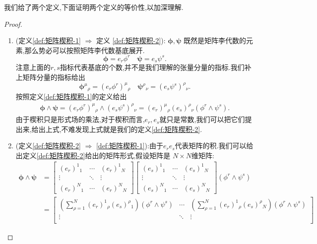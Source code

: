 \documentclass[../main.tex]{subfiles}
\begin{document}
我们给了两个定义,下面证明两个定义的等价性,以加深理解.
\begin{proof}
\begin{enumerate}
  \item (定义\ref{def:矩阵楔积-1} $\Rightarrow$ 定义 \ref{def:矩阵楔积-2}): $\bm{\phi} ,\bm{\psi}  $ 既然是矩阵李代数的元素,那么势必可以按照矩阵李代数基底展开.\[
  \bm{\phi} =  e_r \phi^r \quad  \bm{\psi} = e_s \psi^s 
  .\] 
  注意上面的$r,s$指标代表基底的个数,并不是我们理解的张量分量的指标.我们补上矩阵分量的指标给出\[
    \bm{\phi}^{\mu}{}_{\rho} = (e_r \phi^r)^{\mu}{}_{\rho} \quad \bm{\psi}^{\rho}{}_\nu = (e_s \psi^s)^{\rho}{}_{\nu}
  .\] 
  按照定义\ref{def:矩阵楔积-1}的定义给出
   \begin{align*}
    \bm{\phi} \wedge \bm{\psi} = (e_r \phi^r)^{\mu}{}_{\rho} \wedge (e_s \psi^s) ^{\rho}{}_{\nu} = (e_r)^{\mu}{}_{\rho}(e_s)^{\rho}{}_{\nu}(\phi^r \wedge \psi^s)   
  .\end{align*}
  由于楔积只是形式场的乘法,对于楔积而言,$e_r,e_s$就只是常数,我们可以把它们提出来,给出上式,不难发现上式就是我们的定义\ref{def:矩阵楔积-2}.
\item (定义\ref{def:矩阵楔积-2} $\Rightarrow$ \ref{def:矩阵楔积-1}):由于$e_r e_s$代表矩阵的积.我们可以给出定义\ref{def:矩阵楔积-2}给出的矩阵形式,假设矩阵是 $N \times N$维矩阵:
   \begin{align*}
     \bm{\phi} \wedge \bm{\psi} &= \begin{bmatrix} (e_r)^{1}{}_{1} & \cdots & (e_r)^{1}{}_{N}\\ \vdots & \ddots & \vdots \\ (e_r)^{N}{}_{1} & \cdots & (e_r)^{N}{}_{N}  \end{bmatrix}   
     \begin{bmatrix} (e_s)^{1}{}_{1} & \cdots & (e_s)^{1}{}_{N}\\ \vdots & \ddots & \vdots \\ (e_s)^{N}{}_{1} & \cdots & (e_s)^{N}{}_{N}  \end{bmatrix}
     (\phi^r \wedge \psi^s)\\
                                     & = \begin{bmatrix}
                                       \left(\sum\limits^N_{\rho = 1} (e_r)^{1}{}_{\rho}(e_s)^{\rho}{}_{1} \right)(\phi^r \wedge \psi^s)& \cdots & \left(\sum\limits^N_{\rho = 1} (e_r)^{1}{}_{\rho}(e_s)^{\rho}{}_{N} \right)(\phi^r \wedge \psi^s) \\
                                       \vdots & \ddots & \vdots\\

\end{bmatrix}
\end{align*}
\end{enumerate}
\end{proof}
\end{document}
